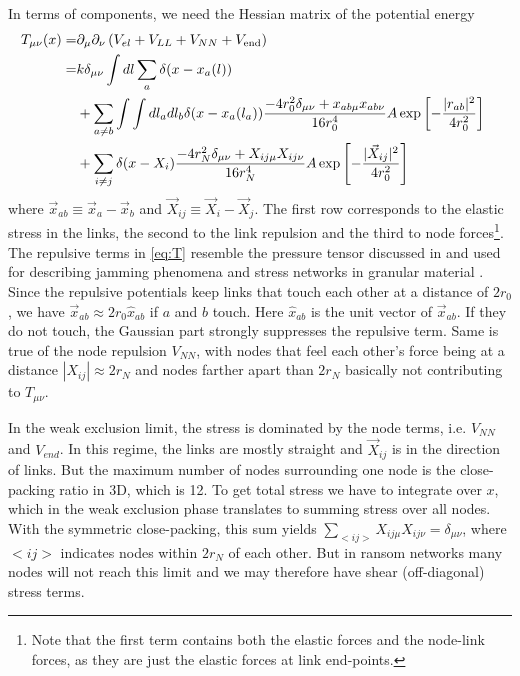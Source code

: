 \documentclass[nofootinbib,preprint,floatfix,endfloats]{revtex4} %
\begin{document}
In terms of components, we need the Hessian matrix of the potential energy
\begin{align}
    T_{\mu\nu}(x) =&  %
    \ro_\mu \ro_\nu \pr{V_{el}+V_{LL} + V_{NN}+V_\mathrm{end}} \cr
    =& k \delta_{\mu\nu}\int dl \sum_a \delta(x-x_a(l)) \cr
    &+ 
    \sum_{a\ne b} \int \int dl_a dl_b \delta(x-x_a(l_a))\frac{-4r_0^2\delta_{\mu\nu}+ x_{ab\mu} x_{ab\nu}}{16r_0^4}
    A \exp\left[- {|r_{ab}|^2 \over 4 r_0^2}\right]\cr
    &+ \sum_{i\ne j}\delta(x-X_i)\frac{-4r_N^2\delta_{\mu\nu}+ X_{ij\mu}X_{ij\nu}}{16r_N^4}
    A \exp\left[- {| \vec{X}_{ij}|^2 \over 4 r_0^2}\right]
    \label{eq:T}
\end{align}
where $\vec{x}_{ab} \equiv \vec{x}_a-\vec{x}_b$ and $\vec{X}_{ij} \equiv \vec{X}_i-\vec{X}_j$. The first row corresponds to the elastic stress in the links, the second to the link repulsion and the third to node forces\footnote{
Note that the first term contains both the elastic forces and the node-link forces, as they are just the elastic forces at link end-points.}. 
The repulsive terms in \eqref{eq:T} resemble the pressure tensor discussed in \cite{stillinger1984packing} and used for describing jamming phenomena and stress networks in granular material  \cite{o2002random,o2003jamming}.  
Since the repulsive potentials keep links that touch each other at a distance of $2r_0$, we have $\vec{x}_{ab}\approx 2r_0 \hat{x}_{ab}$ if $a$ and $b$ touch. 
Here $\hat{x}_{ab}$ is the unit vector of $\vec{x}_{ab}$.  
If they do not touch, the Gaussian part strongly suppresses the repulsive term. 
Same is true of the node repulsion $V_{NN}$, with nodes that feel each other's force being at a distance $|X_{ij}|\approx 2r_N$ and nodes farther apart than $2r_N$ basically not contributing to $T_{\mu\nu}$. 

In the weak exclusion limit, the stress is dominated by the node terms, i.e. $V_{NN}$ and $V_{end}$. 
In this regime, the links are mostly straight and $\vec{X}_{ij}$ is in the direction of links. 
But the maximum number of nodes surrounding one node is the close-packing ratio in 3D, which is 12. 
To get total stress we have to integrate over $x$, which in the weak exclusion phase translates to summing stress over all nodes.
With the symmetric close-packing, this sum yields $\sum_{<ij>} X_{ij\mu}X_{ij\nu} = \delta_{\mu\nu}$, where $<ij>$ indicates nodes within $2r_N$ of each other. 
But in ransom networks many nodes will not reach this limit and we may therefore have shear (off-diagonal) stress terms.  
\end{document}
